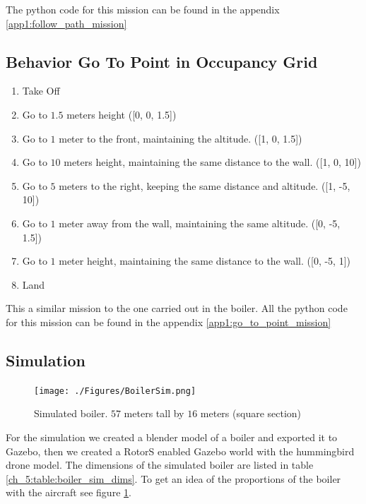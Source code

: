     The python code for this mission can be found in the appendix \ref{app1:follow_path_mission}

  \subsection{Behavior Go To Point in Occupancy Grid} \label{ch_5:subsect:behav_gtp_mission}

    \begin{enumerate}
      \item Take Off
      \item Go to $1.5$ meters height ([0, 0, 1.5])
      \item Go to $1$ meter to the front, maintaining the altitude. ([1, 0, 1.5])
      \item Go to $10$ meters height, maintaining the same distance to the wall. ([1, 0, 10])
      \item Go to $5$ meters to the right, keeping the same distance and altitude. ([1, -5, 10])
      \item Go to $1$ meter away from the wall, maintaining the same altitude. ([0, -5, 1.5])
      \item Go to $1$ meter height, maintaining the same distance to the wall. ([0, -5, 1])
      \item Land
    \end{enumerate}

    This a similar mission to the one carried out in the boiler. All the python code for this mission can be found in the appendix \ref{app1:go_to_point_mission}

  \pagebreak

  \subsection{Simulation} \label{ch_5:subsect:exp_simulation}

    \begin{figure}[!h]
      \centering
      \texttt{[image: ./Figures/BoilerSim.png]}
      \caption{Simulated boiler. $57$ meters tall by $16$ meters (square section)}
      \label{ch_5:fig:boiler_sim}
    \end{figure}

    For the simulation we created a blender model of a boiler and exported it to Gazebo, then we created a RotorS enabled Gazebo world with the hummingbird drone model. The dimensions of the simulated boiler are listed in table \ref{ch_5:table:boiler_sim_dims}. To get an idea of the proportions of the boiler with the aircraft see figure \ref{ch_5:fig:boiler_sim}.  

